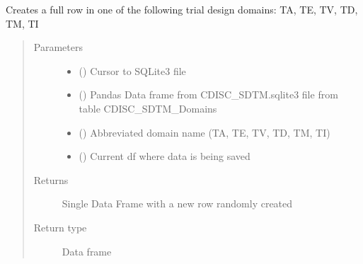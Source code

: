 \documentclass[letterpaper,10pt,english]{sphinxmanual}
\begin{document}

\begin{fulllineitems}
\label{\detokenize{CE_app.synth_trial:CE_app.synth_trial.functions.func_nihpo_create_trial_design_domain_row}}
\sphinxAtStartPar
Creates a full row in one of the following trial design domains: TA, TE, TV, TD, TM, TI
\begin{quote}\begin{description}
\item[{Parameters}] \leavevmode\begin{itemize}
\item {} 
\sphinxAtStartPar
{} () \textendash{} Cursor to SQLite3 file

\item {} 
\sphinxAtStartPar
{} () \textendash{} Pandas Data frame from CDISC\_SDTM.sqlite3 file from table CDISC\_SDTM\_Domains

\item {} 
\sphinxAtStartPar
{} () \textendash{} Abbreviated domain name (TA, TE, TV, TD, TM, TI)

\item {} 
\sphinxAtStartPar
{} () \textendash{} Current df where data is being saved

\end{itemize}

\item[{Returns}] \leavevmode
\sphinxAtStartPar
Single Data Frame with a new row randomly created

\item[{Return type}] \leavevmode
\sphinxAtStartPar
Data frame

\end{description}\end{quote}

\end{fulllineitems}
\end{document}
